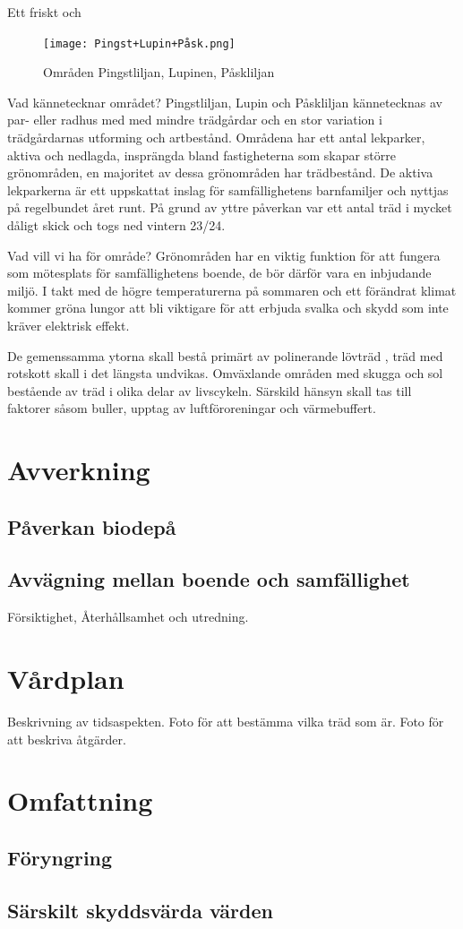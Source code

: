 \documentclass[12pt,a4paper]{article}
\begin{document}
\begin{minipage}{0.5\textwidth}
Ett friskt och 

\begin{figure}[h]
\texttt{[image: Pingst+Lupin+Påsk.png]}
\caption{\label{fig:Pingst} Områden Pingstliljan, Lupinen, Påskliljan}
\end{figure}

Vad kännetecknar området?
Pingstliljan, Lupin och Påskliljan kännetecknas av par- eller radhus med med mindre trädgårdar och en stor variation i trädgårdarnas utforming och artbestånd. 
Områdena har ett antal lekparker, aktiva och nedlagda, insprängda bland fastigheterna som skapar större grönområden, en majoritet av dessa grönområden har trädbestånd. 
De aktiva lekparkerna är ett uppskattat inslag för samfällighetens barnfamiljer och nyttjas på regelbundet året runt. 
På grund av yttre påverkan var ett antal träd i mycket dåligt skick och togs ned vintern 23/24. 

Vad vill vi ha för område?
Grönområden har en viktig funktion för att fungera som mötesplats för samfällighetens boende, de bör därför vara en inbjudande miljö. 
I takt med de högre temperaturerna på sommaren och ett förändrat klimat kommer gröna lungor att bli viktigare för att erbjuda svalka och skydd som inte kräver elektrisk effekt.  

De gemenssamma ytorna skall bestå primärt av polinerande lövträd , träd med rotskott skall i det längsta undvikas. 
Omväxlande områden med skugga och sol bestående av träd i olika delar av livscykeln. 
Särskild hänsyn skall tas till faktorer såsom buller, upptag av luftföroreningar och värmebuffert.




\end{minipage}



\section{Avverkning}
\subsection{Påverkan biodepå}
\subsection{Avvägning mellan boende och samfällighet}
Försiktighet, Återhållsamhet och utredning. 

\section{Vårdplan}
Beskrivning av tidsaspekten.
Foto för att bestämma vilka träd som är. 
Foto för att beskriva åtgärder. 

\section{Omfattning}
\subsection{Föryngring}
\subsection{Särskilt skyddsvärda värden}
\end{document}
